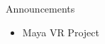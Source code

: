 \begin{frame}{Announcements}
    \begin{itemize}
        \item Maya VR Project
    \end{itemize}
\end{frame}
